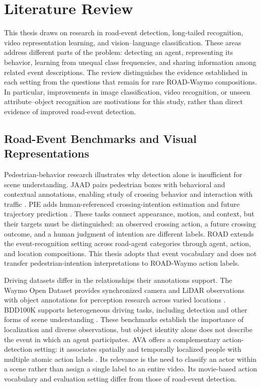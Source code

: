 \chapter{Literature Review}

This thesis draws on research in road-event detection, long-tailed recognition, video representation learning, and vision--language classification. These areas address different parts of the problem: detecting an agent, representing its behavior, learning from unequal class frequencies, and sharing information among related event descriptions. The review distinguishes the evidence established in each setting from the questions that remain for rare ROAD-Waymo compositions. In particular, improvements in image classification, video recognition, or unseen attribute--object recognition are motivations for this study, rather than direct evidence of improved road-event detection.

\section{Road-Event Benchmarks and Visual Representations}

Pedestrian-behavior research illustrates why detection alone is insufficient for scene understanding. JAAD pairs pedestrian boxes with behavioral and contextual annotations, enabling study of crossing behavior and interaction with traffic \cite{jaad-crossing}. PIE adds human-referenced crossing-intention estimation and future trajectory prediction \cite{pie}. These tasks connect appearance, motion, and context, but their targets must be distinguished: an observed crossing action, a future crossing outcome, and a human judgment of intention are different labels. ROAD extends the event-recognition setting across road-agent categories through agent, action, and location compositions. This thesis adopts that event vocabulary and does not transfer pedestrian-intention interpretations to ROAD-Waymo action labels.

Driving datasets differ in the relationships their annotations support. The Waymo Open Dataset provides synchronized camera and LiDAR observations with object annotations for perception research across varied locations \cite{waymo}. BDD100K supports heterogeneous driving tasks, including detection and other forms of scene understanding \cite{bdd}. These benchmarks establish the importance of localization and diverse observations, but object identity alone does not describe the event in which an agent participates. AVA offers a complementary action-detection setting: it associates spatially and temporally localized people with multiple atomic action labels \cite{ava}. Its relevance is the need to classify an actor within a scene rather than assign a single label to an entire video. Its movie-based action vocabulary and evaluation setting differ from those of road-event detection.

